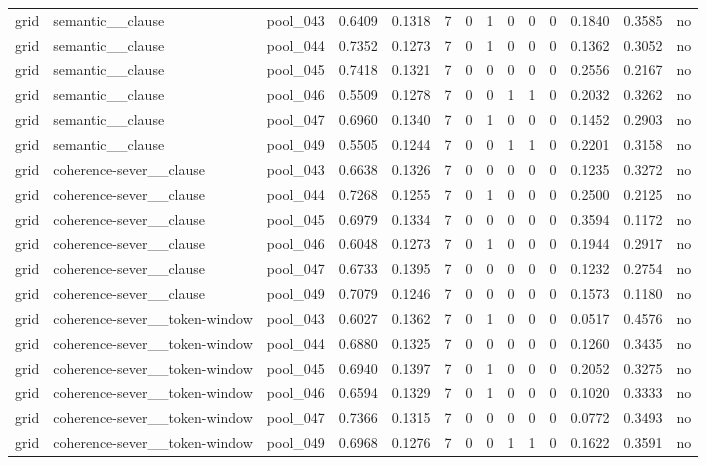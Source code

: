\begin{table}[t]
{\begin{tabular}{llllllllllllll}
grid & semantic\_\_clause & pool\_043 & 0.6409 & 0.1318 & 7 & 0 & 1 & 0 & 0 & 0 & 0.1840 & 0.3585 & no \\
grid & semantic\_\_clause & pool\_044 & 0.7352 & 0.1273 & 7 & 0 & 1 & 0 & 0 & 0 & 0.1362 & 0.3052 & no \\
grid & semantic\_\_clause & pool\_045 & 0.7418 & 0.1321 & 7 & 0 & 0 & 0 & 0 & 0 & 0.2556 & 0.2167 & no \\
grid & semantic\_\_clause & pool\_046 & 0.5509 & 0.1278 & 7 & 0 & 0 & 1 & 1 & 0 & 0.2032 & 0.3262 & no \\
grid & semantic\_\_clause & pool\_047 & 0.6960 & 0.1340 & 7 & 0 & 1 & 0 & 0 & 0 & 0.1452 & 0.2903 & no \\
grid & semantic\_\_clause & pool\_049 & 0.5505 & 0.1244 & 7 & 0 & 0 & 1 & 1 & 0 & 0.2201 & 0.3158 & no \\
grid & coherence-sever\_\_clause & pool\_043 & 0.6638 & 0.1326 & 7 & 0 & 0 & 0 & 0 & 0 & 0.1235 & 0.3272 & no \\
grid & coherence-sever\_\_clause & pool\_044 & 0.7268 & 0.1255 & 7 & 0 & 1 & 0 & 0 & 0 & 0.2500 & 0.2125 & no \\
grid & coherence-sever\_\_clause & pool\_045 & 0.6979 & 0.1334 & 7 & 0 & 0 & 0 & 0 & 0 & 0.3594 & 0.1172 & no \\
grid & coherence-sever\_\_clause & pool\_046 & 0.6048 & 0.1273 & 7 & 0 & 1 & 0 & 0 & 0 & 0.1944 & 0.2917 & no \\
grid & coherence-sever\_\_clause & pool\_047 & 0.6733 & 0.1395 & 7 & 0 & 0 & 0 & 0 & 0 & 0.1232 & 0.2754 & no \\
grid & coherence-sever\_\_clause & pool\_049 & 0.7079 & 0.1246 & 7 & 0 & 0 & 0 & 0 & 0 & 0.1573 & 0.1180 & no \\
grid & coherence-sever\_\_token-window & pool\_043 & 0.6027 & 0.1362 & 7 & 0 & 1 & 0 & 0 & 0 & 0.0517 & 0.4576 & no \\
grid & coherence-sever\_\_token-window & pool\_044 & 0.6880 & 0.1325 & 7 & 0 & 0 & 0 & 0 & 0 & 0.1260 & 0.3435 & no \\
grid & coherence-sever\_\_token-window & pool\_045 & 0.6940 & 0.1397 & 7 & 0 & 1 & 0 & 0 & 0 & 0.2052 & 0.3275 & no \\
grid & coherence-sever\_\_token-window & pool\_046 & 0.6594 & 0.1329 & 7 & 0 & 1 & 0 & 0 & 0 & 0.1020 & 0.3333 & no \\
grid & coherence-sever\_\_token-window & pool\_047 & 0.7366 & 0.1315 & 7 & 0 & 0 & 0 & 0 & 0 & 0.0772 & 0.3493 & no \\
grid & coherence-sever\_\_token-window & pool\_049 & 0.6968 & 0.1276 & 7 & 0 & 0 & 1 & 1 & 0 & 0.1622 & 0.3591 & no \\

\end{tabular}}
\end{table}

